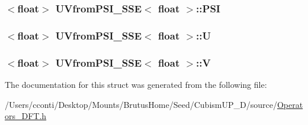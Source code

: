 \subsubsection[{P\+S\+I}]{$<$float$>$ {\bf U\+Vfrom\+P\+S\+I\+\_\+\+S\+S\+E}$<$ float $>$\+::P\+S\+I}\label{struct_u_vfrom_p_s_i___s_s_e_3_01float_01_4_abc94af3bcf4d3d119bcc0290484ead90}
\hypertarget{struct_u_vfrom_p_s_i___s_s_e_3_01float_01_4_aabb930a81564e88a23524891da5f45a9}{}
\subsubsection[{U}]{$<$float$>$ {\bf U\+Vfrom\+P\+S\+I\+\_\+\+S\+S\+E}$<$ float $>$\+::U}\label{struct_u_vfrom_p_s_i___s_s_e_3_01float_01_4_aabb930a81564e88a23524891da5f45a9}
\hypertarget{struct_u_vfrom_p_s_i___s_s_e_3_01float_01_4_a377c8c663c9d5a4552f9fa943fbfd826}{}
\subsubsection[{V}]{$<$float$>$ {\bf U\+Vfrom\+P\+S\+I\+\_\+\+S\+S\+E}$<$ float $>$\+::V}\label{struct_u_vfrom_p_s_i___s_s_e_3_01float_01_4_a377c8c663c9d5a4552f9fa943fbfd826}


The documentation for this struct was generated from the following file\+:\begin{DoxyCompactItemize}
\item 
/\+Users/cconti/\+Desktop/\+Mounts/\+Brutus\+Home/\+Seed/\+Cubism\+U\+P\+\_\+D/source/\hyperlink{_operators___d_f_t_8h}{Operators\+\_\+\+D\+F\+T.\+h}\end{DoxyCompactItemize}
